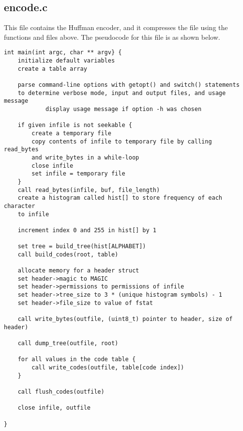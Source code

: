\documentclass[11pt]{article}
\begin{document}
\subsection{encode.c}
This file contains the Huffman encoder, and it compresses the file using the functions and files above. The pseudocode for this file is as shown below.

\begin{verbatim}
int main(int argc, char ** argv} {
    initialize default variables
    create a table array
    
    parse command-line options with getopt() and switch() statements
    to determine verbose mode, input and output files, and usage message
            display usage message if option -h was chosen
    
    if given infile is not seekable {
        create a temporary file
        copy contents of infile to temporary file by calling read_bytes
        and write_bytes in a while-loop
        close infile
        set infile = temporary file
    }
    call read_bytes(infile, buf, file_length)
    create a histogram called hist[] to store frequency of each character
    to infile
    
    increment index 0 and 255 in hist[] by 1
    
    set tree = build_tree(hist[ALPHABET])
    call build_codes(root, table)
    
    allocate memory for a header struct
    set header->magic to MAGIC
    set header->permissions to permissions of infile
    set header->tree_size to 3 * (unique histogram symbols) - 1
    set header->file_size to value of fstat
    
    call write_bytes(outfile, (uint8_t) pointer to header, size of header)
    
    call dump_tree(outfile, root)
    
    for all values in the code table {
        call write_codes(outfile, table[code index])
    }
    
    call flush_codes(outfile)
    
    close infile, outfile
    
}
\end{verbatim}
\end{document}
